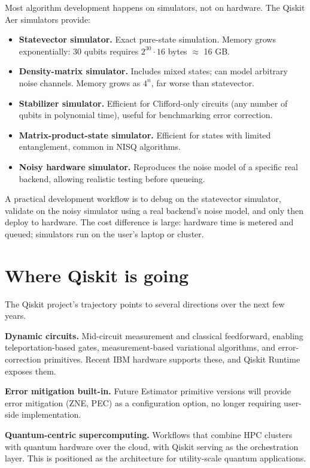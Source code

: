 Most algorithm development happens on simulators, not on hardware. The Qiskit Aer simulators provide:

\begin{itemize}
  \item \textbf{Statevector simulator.} Exact pure-state simulation. Memory grows exponentially: 30 qubits requires $2^{30}\cdot 16$ bytes $\approx$ 16 GB.
  \item \textbf{Density-matrix simulator.} Includes mixed states; can model arbitrary noise channels. Memory grows as $4^n$, far worse than statevector.
  \item \textbf{Stabilizer simulator.} Efficient for Clifford-only circuits (any number of qubits in polynomial time), useful for benchmarking error correction.
  \item \textbf{Matrix-product-state simulator.} Efficient for states with limited entanglement, common in NISQ algorithms.
  \item \textbf{Noisy hardware simulator.} Reproduces the noise model of a specific real backend, allowing realistic testing before queueing.
\end{itemize}

A practical development workflow is to debug on the statevector simulator, validate on the noisy simulator using a real backend's noise model, and only then deploy to hardware. The cost difference is large: hardware time is metered and queued; simulators run on the user's laptop or cluster.

\section{Where Qiskit is going}

The Qiskit project's trajectory points to several directions over the next few years.

\textbf{Dynamic circuits.} Mid-circuit measurement and classical feedforward, enabling teleportation-based gates, measurement-based variational algorithms, and error-correction primitives. Recent IBM hardware supports these, and Qiskit Runtime exposes them.

\textbf{Error mitigation built-in.} Future Estimator primitive versions will provide error mitigation (ZNE, PEC) as a configuration option, no longer requiring user-side implementation.

\textbf{Quantum-centric supercomputing.} Workflows that combine HPC clusters with quantum hardware over the cloud, with Qiskit serving as the orchestration layer. This is positioned as the architecture for utility-scale quantum applications.

